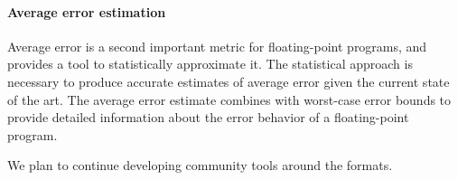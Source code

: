 \documentclass[main.tex]{subfiles}
\begin{document}
\paragraph{Average error estimation}
Average error is a second important metric for floating-point programs,
  and \name provides a tool to statistically approximate it.
The statistical approach is necessary to produce accurate estimates
  of average error given the current state of the art.
The average error estimate combines with worst-case error bounds
  to provide detailed information about the error behavior
  of a floating-point program.

We plan to continue developing community tools
  around the \name formats.
\end{document}

